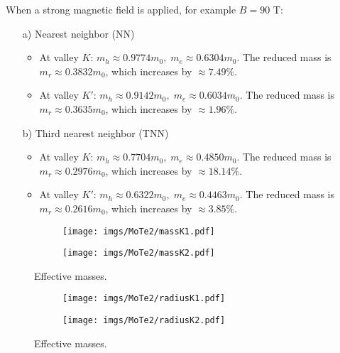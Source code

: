 \documentclass{article}
\begin{document}
When a strong magnetic field is applied, for example $B = 90$ T:

\begin{itemize}
	\item[a)] Nearest neighbor (NN)
	      \begin{itemize}
		      \item At valley $K$: $m_{h} \approx 0.9774 m_{0},\; m_{e} \approx 0.6304 m_{0}$.
		            The reduced mass is $m_{r} \approx 0.3832 m_{0}$, which increases by $\approx 7.49\%$.

		      \item At valley $K'$: $m_{h} \approx 0.9142 m_{0},\; m_{e} \approx 0.6034 m_{0}$.
		            The reduced mass is $m_{r} \approx 0.3635 m_{0}$, which increases by $\approx 1.96\%$.
	      \end{itemize}
	\item[b)] Third nearest neighbor (TNN)
	      \begin{itemize}
		      \item At valley $K$: $m_{h} \approx 0.7704 m_{0},\; m_{e} \approx 0.4850 m_{0}$.
		            The reduced mass is $m_{r} \approx 0.2976 m_{0}$, which increases by $\approx 18.14\%$.

		      \item At valley $K'$: $m_{h} \approx 0.6322 m_{0},\; m_{e} \approx 0.4463 m_{0}$.
		            The reduced mass is $m_{r} \approx 0.2616 m_{0}$, which increases by $\approx 3.85\%$.
	      \end{itemize}
\end{itemize}

\begin{figure}[htb]
	\begin{subfigure}{0.495\textwidth}
		\centering
		\texttt{[image: imgs/MoTe2/massK1.pdf]}
	\end{subfigure}
	\begin{subfigure}{0.495\textwidth}
		\centering
		\texttt{[image: imgs/MoTe2/massK2.pdf]}
	\end{subfigure}
	\caption{Effective masses.}
\end{figure}
\begin{figure}[!h]
	\begin{subfigure}{0.495\textwidth}
		\centering
		\texttt{[image: imgs/MoTe2/radiusK1.pdf]}
	\end{subfigure}
	\begin{subfigure}{0.495\textwidth}
		\centering
		\texttt{[image: imgs/MoTe2/radiusK2.pdf]}
	\end{subfigure}
	\caption{Effective masses.}
\end{figure}
\end{document}

